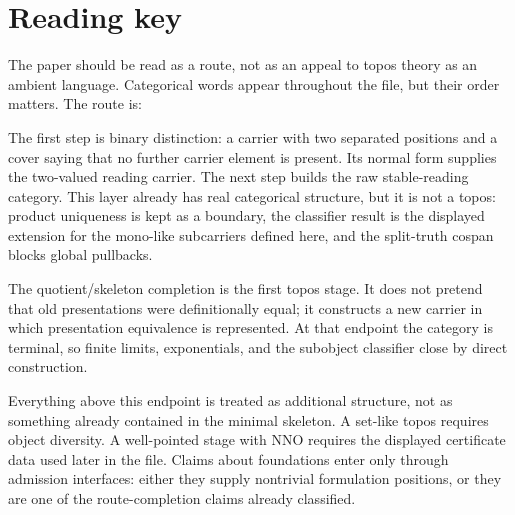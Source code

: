 \documentclass[11pt]{article}
\begin{document}
\section*{Reading key}

The paper should be read as a route, not as an appeal to topos theory as
an ambient language.  Categorical words appear throughout the file, but
their order matters.  The route is:

\begin{center}
\end{center}

The first step is binary distinction: a carrier with two separated
positions and a cover saying that no further carrier element is present.
Its normal form supplies the two-valued reading carrier.  The next step
builds the raw stable-reading category.  This layer already has real
categorical structure, but it is not a topos: product uniqueness is kept
as a boundary, the classifier result is the displayed extension for the
mono-like subcarriers defined here, and the split-truth cospan blocks
global pullbacks.

The quotient/skeleton completion is the first topos stage.  It does not
pretend that old presentations were definitionally equal; it constructs
a new carrier in which presentation equivalence is represented.  At that
endpoint the category is terminal, so finite limits, exponentials, and
the subobject classifier close by direct construction.

Everything above this endpoint is treated as additional structure, not
as something already contained in the minimal skeleton.  A set-like
topos requires object diversity.  A well-pointed stage with NNO requires
the displayed certificate data used later in the file.  Claims about
foundations enter only through admission interfaces: either they supply
nontrivial formulation positions, or they are one of the route-completion
claims already classified.
\end{document}
